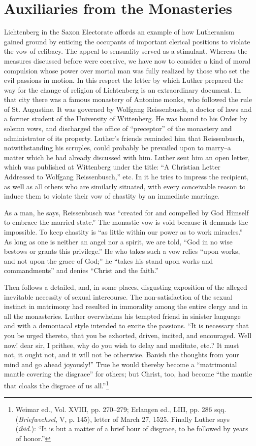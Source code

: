 \section{Auxiliaries from the Monasteries}

Lichtenberg in the Saxon Electorate affords an example of how
Lutheranism gained ground by enticing the occupants of important
clerical positions to violate the vow of celibacy. The appeal to sensuality
served as a stimulant. Whereas the measures discussed before
were coercive, we have now to consider a kind of moral compulsion
whose power over mortal man was fully realized by those who set the
evil passions in motion. In this respect the letter by which Luther
prepared the way for the change of religion of Lichtenberg is an
extraordinary document. In that city there was a famous monastery
of Antonine monks, who followed the rule of St. Augustine. It was
governed by Wolfgang Reissenbusch, a doctor of laws and a former
student of the University of Wittenberg. He was bound to his Order
by solemn vows, and discharged the office of “preceptor” of the
monastery and administrator of its property. Luther’s friends reminded
him that Reissenbusch, notwithstanding his scruples, could
probably be prevailed upon to marry--a matter which he had already
discussed with him. Luther sent him an open letter, which was published
at Wittenberg under the title: “A Christian Letter Addressed
to Wolfgang Reissenbusch,” etc. In it he tries to impress the recipient,
as well as all others who are similarly situated, with every conceivable
reason to induce them to violate their vow of chastity by an immediate marriage.

As a man, he says, Reissenbusch was “created for and compelled by God
Himself to embrace the married state.” The monastic vow is void because it
demands the impossible. To keep chastity is “as little within our power as
to work miracles.” As long as one is neither an angel nor a spirit, we are
told, “God in no wise bestows or grants this privilege.” He who takes such a
vow relies “upon works, and not upon the grace of God;” he “takes his
stand upon works and commandments” and denies “Christ and the faith.”

Then follows a detailed, and, in some places, disgusting exposition of the
alleged inevitable necessity of sexual intercourse. The non-satisfaction of
the sexual instinct in matrimony had resulted in immorality among the
entire clergy and in all the monasteries. Luther overwhelms his tempted
friend in sinister language and with a demoniacal style intended to excite the
passions. “It is necessary that you be urged thereto, that you be exhorted,
driven, incited, and encouraged. Well now! dear sir, I prithee, why do
you wish to delay and meditate, etc.? It must not, it ought not, and it will
not be otherwise. Banish the thoughts from your mind and go ahead joyously!”
True he would thereby become a “matrimonial mantle covering the
disgrace” for others; but Christ, too, had become “the mantle that cloaks the
disgrace of us all.”\footnote
{Weimar ed., Vol. XVIII, pp. 270--279; Erlangen ed., LIII, pp. 286 sqq. (\textit{Briefwechsel},
V, p. 145), letter of March 27, 1525. Finally Luther says (\textit{ibid.}): “It is but a matter of a
brief hour of disgrace, to be followed by years of honor.”}

